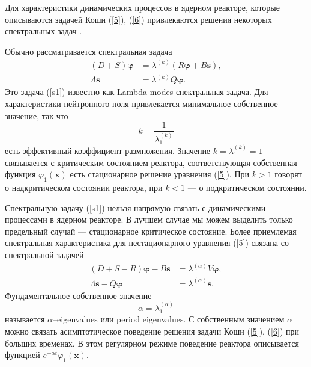 Для характеристики динамических процессов в ядерном реакторе, которые описываются задачей Коши 
(\ref{5}), (\ref{6}) привлекаются решения некоторых спектральных задач \cite{Bell1970,hetrick1971dynamics,stacey}.

Обычно рассматривается спектральная задача
\begin{equation}\label{s1}
\begin{split}
(D+S) \bm \varphi  &= \lambda^{(k)}(R \bm \varphi + B \bm s),\\
\Lambda \bm s &= \lambda^{(k)} Q \bm \varphi.
\end{split}
\end{equation} 
Это задача (\ref{s1}) известно как Lambda modes спектральная задача. 
Для характеристики нейтронного поля привлекается минимальное собственное значение, так что
\[
 k = \frac{1}{\lambda^{(k)}_1}  
\] 
есть эффективный коэффициент размножения.
Значение $k = \lambda^{(k)}_1 = 1$ связывается с критическим состоянием реактора, соответствующая
собственная функция $\varphi_1(\bm x)$ есть стационарное решение уравнения (\ref{5}).
При $k > 1$  говорят о надкритическом состоянии реактора, при $k < 1$  --- о подкритическом состоянии.


Спектральную задачу (\ref{s1}) нельзя напрямую связать с динамическими процессами в ядерном реакторе.
В лучшем случае мы можем выделить только предельный случай --- стационарное критическое состояние.
Более приемлемая спектральная характеристика для нестационарного уравнения (\ref{5}) связана со спектральной задачей 
\begin{equation}\label{s2}
\begin{split}
 (D+S - R) \bm \varphi  -  B \bm s & = \lambda^{(\alpha)} V \bm \varphi , \\
 \Lambda \bm s - Q \bm \varphi & =  \lambda^{(\alpha)}   \bm s .
\end{split} 
\end{equation} 
Фундаментальное собственное значение
\[ 
 \alpha = \lambda^{(\alpha)}_1
\]
называется \cite{Bell1970}
$\alpha$--eigenvalues или period eigenvalues.
С собственным значением $\alpha$ 
можно связать асимптотическое поведение
решения задачи Коши (\ref{5}), (\ref{6}) при больших временах.
В этом регулярном режиме поведение реактора описывается функцией $e^{-\alpha t} \varphi_1(\bm x)$.


